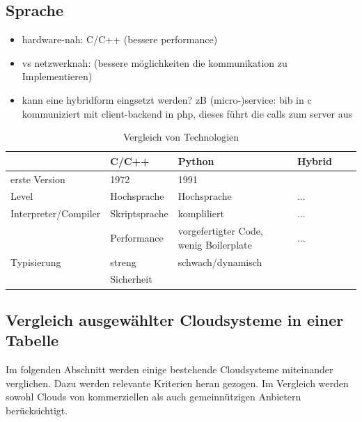 \documentclass[a4paper,10pt]{article}
\numberwithin{figure}{section}
\numberwithin{table}{section}
\begin{document}
\cite{ArchitectingTheCloud}

\subsection{Sprache}

\begin{itemize}
 \item hardware-nah: C/C++ (bessere performance)
 \item vs netzwerknah: (bessere möglichkeiten die kommunikation zu Implementieren)
 \item kann eine hybridform eingsetzt werden?
 zB (micro-)service: bib in c kommuniziert mit client-backend in php, dieses führt die calls zum server aus
\end{itemize}

\begin{table}[H]
\centering
\caption{Vergleich von Technologien}
\label{my-label}
\renewcommand{\arraystretch}{1.5}
\begin{tabular}{llllll}
\hline
 & C/C++ & Python & Hybrid\\
\hline
erste Version & 1972 & 1991 & \\
Level & Hochsprache & Hochsprache & ...\\
Interpreter/Compiler & Skriptsprache & kompliliert & ...\\
 & Performance & vorgefertigter Code, wenig Boilerplate & ...\\
Typisierung & streng & schwach/dynamisch & \\
 & Sicherheit && \\
\hline
\end{tabular}
\end{table}

\subsection{Vergleich ausgewählter Cloudsysteme in einer Tabelle}

Im folgenden Abschnitt werden einige bestehende Cloudsysteme miteinander verglichen.
Dazu werden relevante Kriterien heran gezogen.
Im Vergleich werden sowohl Clouds von kommerziellen als auch gemeinnützigen Anbietern berücksichtigt.
\end{document}
